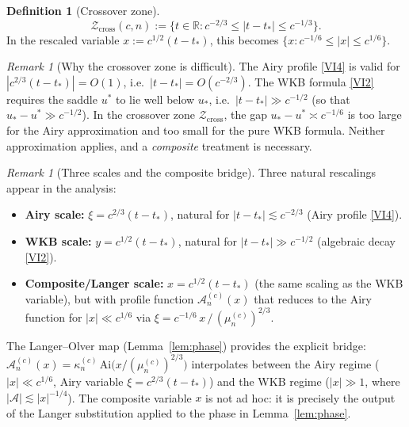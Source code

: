 \documentclass[12pt,a4paper]{amsart}
\theoremstyle{definition}
\newtheorem{definition}[theorem]{Definition}
\theoremstyle{remark}
\newtheorem{remark}[theorem]{Remark}
\newcommand{\Ai}{\mathrm{Ai}}
\newcommand{\ustar}{u_*}
\newcommand{\usaddle}{u^*}
\newcommand{\Zcross}{\mathcal{Z}_{\mathrm{cross}}}
\newcommand{\tstar}{t_*}
\begin{document}
\begin{definition}[Crossover zone]
\label{def:Zcross}
\[
\Zcross(c,n)
:= \bigl\{t \in \mathbb{R} :
c^{-2/3} \le |t - \tstar| \le c^{-1/3}\bigr\}.
\]
In the rescaled variable $x := c^{1/2}(t - \tstar)$,
this becomes $\{x : c^{-1/6} \le |x| \le c^{1/6}\}$.
\end{definition}

\begin{remark}[Why the crossover zone is difficult]
\label{rem:difficulty}
The Airy profile \eqref{VI4} is valid for
$|c^{2/3}(t-\tstar)| = O(1)$,
i.e.\ $|t-\tstar| = O(c^{-2/3})$.
The WKB formula \eqref{VI2} requires the saddle
$\usaddle$ to lie well below $\ustar$, i.e.\
$|t - \tstar| \gg c^{-1/2}$ (so that
$\ustar - \usaddle \gg c^{-1/2}$).
In the crossover zone $\Zcross$, the gap
$\ustar - \usaddle \asymp c^{-1/6}$
is too large for the Airy approximation
and too small for the pure WKB formula.
Neither approximation applies, and a
\emph{composite} treatment is necessary.
\end{remark}

\begin{remark}[Three scales and the composite bridge]
\label{rem:scales}
Three natural rescalings appear in the analysis:
\begin{itemize}
\item \textbf{Airy scale:} $\xi = c^{2/3}(t - \tstar)$,
  natural for $|t - \tstar| \lesssim c^{-2/3}$
  (Airy profile \eqref{VI4}).
\item \textbf{WKB scale:} $y = c^{1/2}(t - \tstar)$,
  natural for $|t - \tstar| \gg c^{-1/2}$
  (algebraic decay \eqref{VI2}).
\item \textbf{Composite/Langer scale:}
  $x = c^{1/2}(t - \tstar)$ (the same scaling as the WKB variable),
  but with profile function $\mathcal{A}_n^{(c)}(x)$
  that reduces to the Airy function for
  $|x| \ll c^{1/6}$ via
  $\xi = c^{-1/6}\, x\,/\,({\mu_n^{(c)}})^{2/3}$.
\end{itemize}
The Langer--Olver map (Lemma~\ref{lem:phase})
provides the explicit bridge:
$\mathcal{A}_n^{(c)}(x)
= \kappa_n^{(c)}\,\Ai\!\bigl(x/(\mu_n^{(c)})^{2/3}\bigr)$
interpolates between the Airy regime
($|x| \ll c^{1/6}$, Airy variable $\xi = c^{2/3}(t-\tstar)$)
and the WKB regime
($|x| \gg 1$, where $|\mathcal{A}| \lesssim |x|^{-1/4}$).
The composite variable $x$ is not ad hoc:
it is precisely the output of the Langer substitution
applied to the phase in Lemma~\ref{lem:phase}.
\end{remark}
\end{document}
